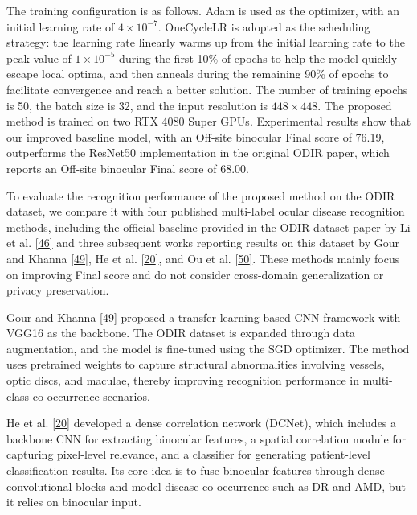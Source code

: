 The training configuration is as follows. Adam is used as the optimizer, with an initial learning rate of \(4 \times 10^{-7}\). OneCycleLR is adopted as the scheduling strategy: the learning rate linearly warms up from the initial learning rate to the peak value of \(1 \times 10^{-5}\) during the first 10\% of epochs to help the model quickly escape local optima, and then anneals during the remaining 90\% of epochs to facilitate convergence and reach a better solution. The number of training epochs is 50, the batch size is 32, and the input resolution is \(448 \times 448\). The proposed method is trained on two RTX 4080 Super GPUs. Experimental results show that our improved baseline model, with an Off-site binocular Final score of 76.19, outperforms the ResNet50 implementation in the original ODIR paper, which reports an Off-site binocular Final score of 68.00.


To evaluate the recognition performance of the proposed method on the ODIR dataset, we compare it with four published multi-label ocular disease recognition methods, including the official baseline provided in the ODIR dataset paper by Li et al. \hyperref[_Ref213949402]{{[}46{]}} and three subsequent works reporting results on this dataset by Gour and Khanna \hyperref[_Ref214903299]{{[}49{]}}, He et al. \hyperref[_Ref213950338]{{[}20{]}}, and Ou et al. \hyperref[_Ref214903327]{{[}50{]}}. These methods mainly focus on improving Final score and do not consider cross-domain generalization or privacy preservation.

Gour and Khanna \hyperref[_Ref214903299]{{[}49{]}} proposed a transfer-learning-based CNN framework with VGG16 as the backbone. The ODIR dataset is expanded through data augmentation, and the model is fine-tuned using the SGD optimizer. The method uses pretrained weights to capture structural abnormalities involving vessels, optic discs, and maculae, thereby improving recognition performance in multi-class co-occurrence scenarios.

He et al. \hyperref[_Ref213950338]{{[}20{]}} developed a dense correlation network (DCNet), which includes a backbone CNN for extracting binocular features, a spatial correlation module for capturing pixel-level relevance, and a classifier for generating patient-level classification results. Its core idea is to fuse binocular features through dense convolutional blocks and model disease co-occurrence such as DR and AMD, but it relies on binocular input.

